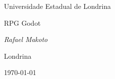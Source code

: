 \begin{titlepage}
  \centering
  \vspace*{2cm}
  {\Large Universidade Estadual de Londrina \par}
  \vspace{3cm}
  {\Huge RPG Godot \par}
  \vspace{2cm}
  {\Large\itshape Rafael Makoto \par}
  \vfill
  {\large Londrina \par}
  {\Large \today \par}
\end{titlepage}
